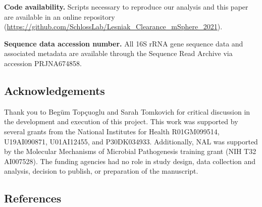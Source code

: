 \documentclass[12pt,]{article}
\begin{document}
\textbf{Code availability.} Scripts necessary to reproduce our analysis
and this paper are available in an online repository
(\url{https://github.com/SchlossLab/Lesniak_Clearance_mSphere_2021}).

\textbf{Sequence data accession number.} All 16S rRNA gene sequence data
and associated metadata are available through the Sequence Read Archive
via accession PRJNA674858.

\hypertarget{acknowledgements}{%
\subsection{Acknowledgements}\label{acknowledgements}}

Thank you to Begüm Topçuoglu and Sarah Tomkovich for critical discussion
in the development and execution of this project. This work was
supported by several grants from the National Institutes for Health
R01GM099514, U19AI090871, U01AI12455, and P30DK034933. Additionally, NAL
was supported by the Molecular Mechanisms of Microbial Pathogenesis
training grant (NIH T32 AI007528). The funding agencies had no role in
study design, data collection and analysis, decision to publish, or
preparation of the manuscript.

\newpage

\hypertarget{references}{%
\subsection{References}\label{references}}
\end{document}

